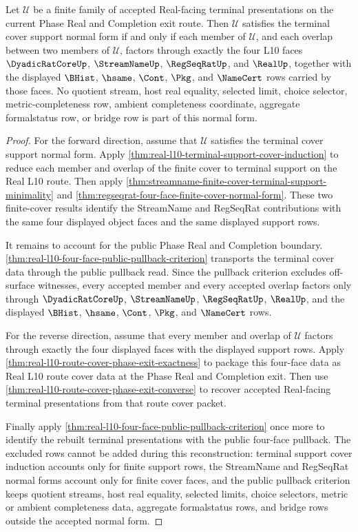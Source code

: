 \begin{theorem}
\label{thm:real-l10-terminal-cover-support-normal-form}
Let $\mathcal{U}$ be a finite family of accepted Real-facing terminal
presentations on the current Phase Real and Completion exit route. Then
$\mathcal{U}$ satisfies the terminal cover support normal form if and only if
each member of $\mathcal{U}$, and each overlap between two members of
$\mathcal{U}$, factors through exactly the four L10 faces
$\DyadicRatCoreUp$, $\StreamNameUp$, $\RegSeqRatUp$, and $\RealUp$, together
with the displayed $\BHist$, $\hsame$, $\Cont$, $\Pkg$, and $\NameCert$ rows
carried by those faces. No quotient stream, host real equality, selected
limit, choice selector, metric-completeness row, ambient completeness
coordinate, aggregate formalstatus row, or bridge row is part of this normal
form.
\end{theorem}
\begin{proof}
For the forward direction, assume that $\mathcal{U}$ satisfies the terminal
cover support normal form. Apply
\autoref{thm:real-l10-terminal-support-cover-induction} to reduce each member
and overlap of the finite cover to terminal support on the Real L10 route.
Then apply
\autoref{thm:streamname-finite-cover-terminal-support-minimality} and
\autoref{thm:regseqrat-four-face-finite-cover-normal-form}. These two
finite-cover results identify the StreamName and RegSeqRat contributions
with the same four displayed object faces and the same displayed support
rows.

It remains to account for the public Phase Real and Completion boundary.
\autoref{thm:real-l10-four-face-public-pullback-criterion} transports the
terminal cover data through the public pullback read. Since the pullback
criterion excludes off-surface witnesses, every accepted member and every
accepted overlap factors only through $\DyadicRatCoreUp$, $\StreamNameUp$,
$\RegSeqRatUp$, $\RealUp$, and the displayed $\BHist$, $\hsame$, $\Cont$,
$\Pkg$, and $\NameCert$ rows.

For the reverse direction, assume that every member and overlap of
$\mathcal{U}$ factors through exactly the four displayed faces with the
displayed support rows. Apply
\autoref{thm:real-l10-route-cover-phase-exit-exactness} to package this
four-face data as Real L10 route cover data at the Phase Real and Completion
exit. Then use
\autoref{thm:real-l10-route-cover-phase-exit-converse} to recover accepted
Real-facing terminal presentations from that route cover packet.

Finally apply
\autoref{thm:real-l10-four-face-public-pullback-criterion} once more to
identify the rebuilt terminal presentations with the public four-face
pullback. The excluded rows cannot be added during this reconstruction:
terminal support cover induction accounts only for finite support rows, the
StreamName and RegSeqRat normal forms account only for finite cover faces, and
the public pullback criterion keeps quotient streams, host real equality,
selected limits, choice selectors, metric or ambient completeness data,
aggregate formalstatus rows, and bridge rows outside the accepted normal
form.
\end{proof}

